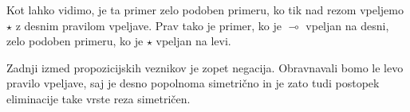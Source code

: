 \begin{prooftree}

\end{prooftree}
\dol
\begin{prooftree}

\end{prooftree}
Kot lahko vidimo, je ta primer zelo podoben primeru, ko tik nad rezom vpeljemo $\star$ z desnim pravilom vpeljave. Prav tako je primer, ko je $\multimap$ vpeljan na desni, zelo podoben primeru, ko je $\star$ vpeljan na levi.
\begin{prooftree}

\end{prooftree}
\dol
\begin{prooftree}

\end{prooftree}
Zadnji izmed propozicijskih veznikov je zopet negacija. Obravnavali bomo le levo pravilo vpeljave, saj je desno popolnoma simetrično in je zato tudi postopek eliminacije take vrste reza simetričen.
\begin{prooftree}

\end{prooftree}
